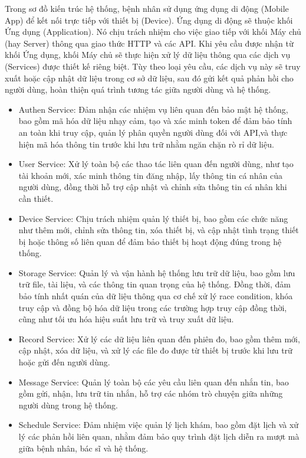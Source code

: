 Trong sơ đồ kiến trúc hệ thống, bệnh nhân sử dụng ứng dụng di động (Mobile App) để kết nối trực tiếp với thiết bị (Device).
Ứng dụng di động sẽ thuộc khối Ứng dụng (Application). Nó chịu trách nhiệm cho việc giao tiếp với khối Máy chủ (hay Server) thông qua giao thức HTTP và các API.
Khi yêu cầu được nhận từ khối Ứng dụng, khối Máy chủ sẽ thực hiện xử lý dữ liệu thông qua các dịch vụ (Services) được thiết kế riêng biệt.
Tùy theo loại yêu cầu, các dịch vụ này sẽ truy xuất hoặc cập nhật dữ liệu trong cơ sở dữ liệu, sau đó gửi kết quả phản hồi cho người dùng,
hoàn thiện quá trình tương tác giữa người dùng và hệ thống.\begin{adjustwidth}{1.5em}{}
	\begin{itemize}
		\item Authen Service: Đảm nhận các nhiệm vụ liên quan đến bảo mật hệ thống, bao gồm mã hóa dữ liệu nhạy cảm, tạo và xác minh token để đảm bảo tính an toàn khi truy cập,
		      quản lý phân quyền người dùng đối với API,và thực hiện mã hóa thông tin trước khi lưu trữ nhằm ngăn chặn rò rỉ dữ liệu.
		\item User Service: Xử lý toàn bộ các thao tác liên quan đến người dùng, như tạo tài khoản mới, xác minh thông tin đăng nhập, lấy thông tin cá nhân của người dùng,
		      đồng thời hỗ trợ cập nhật và chỉnh sửa thông tin cá nhân khi cần thiết.
		\item Device Service: Chịu trách nhiệm quản lý thiết bị, bao gồm các chức năng như thêm mới, chỉnh sửa thông tin, xóa thiết bị,
		      và cập nhật tình trạng thiết bị hoặc thông số liên quan để đảm bảo thiết bị hoạt động đúng trong hệ thống.
		\item Storage Service: Quản lý và vận hành hệ thống lưu trữ dữ liệu, bao gồm lưu trữ file, tài liệu, và các thông tin quan trọng của hệ thống.
		      Đồng thời, đảm bảo tính nhất quán của dữ liệu thông qua cơ chế xử lý race condition, khóa truy cập và đồng bộ hóa dữ liệu trong các trường hợp truy cập đồng thời,
		      cũng như tối ưu hóa hiệu suất lưu trữ và truy xuất dữ liệu.
		\item Record Service: Xử lý các dữ liệu liên quan đến phiên đo, bao gồm thêm mới, cập nhật, xóa dữ liệu, và xử lý các file đo được từ thiết bị trước khi lưu trữ hoặc gửi đến người dùng.
		\item Message Service: Quản lý toàn bộ các yêu cầu liên quan đến nhắn tin, bao gồm gửi, nhận, lưu trữ tin nhắn, hỗ trợ các nhóm trò chuyện giữa những người dùng trong hệ thống.
		\item Schedule Service: Đảm nhiệm việc quản lý lịch khám, bao gồm đặt lịch và xử lý các phản hồi liên quan, nhằm đảm bảo quy trình đặt lịch diễn ra mượt mà giữa bệnh nhân, bác sĩ và hệ thống.

\end{itemize}
\end{adjustwidth}

